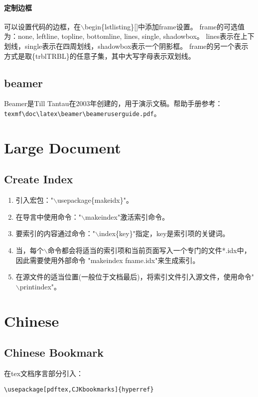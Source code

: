 \paragraph{定制边框}
可以设置代码的边框，在$\backslash$begin\{lstlisting\}[]中添加frame设置。
frame的可选值为：none, leftline, topline, bottomline, lines, single, shadowbox。
lines表示在上下划线，single表示在四周划线，shadowbox表示一个阴影框。
frame的另一个表示方式是取\{trblTRBL\}的任意子集，其中大写字母表示双划线。

\subsection{beamer}
Beamer是Till Tantau在2003年创建的，用于演示文稿。帮助手册参考：
\verb|texmf\doc\latex\beamer\beameruserguide.pdf|。


\newpage
\section{Large Document}
\subsection{Create Index}
\begin{enumerate}
\item 引入宏包："$\backslash$usepackage\{makeidx\}"。
\item 在导言中使用命令："$\backslash$makeindex"激活索引命令。
\item 要索引的内容通过命令："$\backslash$index\{key\}"指定，key是索引项的关键词。
\item 当，每个$\backslash$命令都会将适当的索引项和当前页面写入一个专门的文件*.idx中，因此需要使用外部命令
"makeindex\label{latex-tools-makeindex} fname.idx"来生成索引。
\item 在源文件的适当位置(一般位于文档最后)，将索引文件引入源文件，使用命令"$\backslash$printindex"。
\end{enumerate}

\newpage
\section{Chinese}
\subsection{Chinese Bookmark}
在tex文档序言部分引入：
\begin{lstlisting}
\usepackage[pdftex,CJKbookmarks]{hyperref}
\end{lstlisting}

